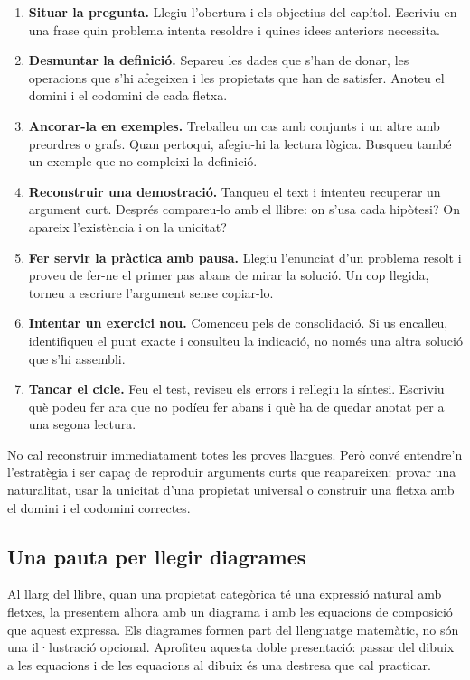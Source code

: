 \begin{enumerate}
  \item \textbf{Situar la pregunta.} Llegiu l'obertura i els
        objectius del capítol. Escriviu en una frase quin
        problema intenta resoldre i quines idees anteriors
        necessita.
  \item \textbf{Desmuntar la definició.} Separeu les dades
        que s'han de donar, les operacions que s'hi afegeixen
        i les propietats que han de satisfer. Anoteu el
        domini i el codomini de cada fletxa.
  \item \textbf{Ancorar-la en exemples.} Treballeu un cas
        amb conjunts i un altre amb preordres o grafs.
        Quan pertoqui, afegiu-hi la lectura lògica. Busqueu
        també un exemple que no compleixi la definició.
  \item \textbf{Reconstruir una demostració.} Tanqueu el
        text i intenteu recuperar un argument curt. Després
        compareu-lo amb el llibre: on s'usa cada hipòtesi?
        On apareix l'existència i on la unicitat?
  \item \textbf{Fer servir la pràctica amb pausa.} Llegiu
        l'enunciat d'un problema resolt i proveu de fer-ne
        el primer pas abans de mirar la solució. Un cop
        llegida, torneu a escriure l'argument sense copiar-lo.
  \item \textbf{Intentar un exercici nou.} Comenceu pels
        de consolidació. Si us encalleu, identifiqueu el
        punt exacte i consulteu la indicació, no només
        una altra solució que s'hi assembli.
  \item \textbf{Tancar el cicle.} Feu el test, reviseu els
        errors i rellegiu la síntesi. Escriviu què podeu
        fer ara que no podíeu fer abans i què ha de quedar
        anotat per a una segona lectura.
\end{enumerate}

No cal reconstruir immediatament totes les proves llargues.
Però convé entendre'n l'estratègia i ser capaç de reproduir
arguments curts que reapareixen: provar una naturalitat,
usar la unicitat d'una propietat universal o construir
una fletxa amb el domini i el codomini correctes.

\subsection*{Una pauta per llegir diagrames}

Al llarg del llibre, quan una propietat categòrica té una expressió
natural amb fletxes, la presentem alhora amb un diagrama i amb les
equacions de composició que aquest expressa. Els diagrames formen
part del llenguatge matemàtic, no són una il·lustració opcional.
Aprofiteu aquesta doble presentació: passar del dibuix a les equacions
i de les equacions al dibuix és una destresa que cal practicar.

